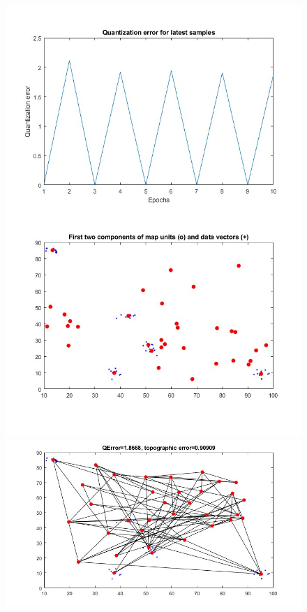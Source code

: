 \documentclass[11pt]{article}
\begin{document}
\begin{figure}[h]
  \includegraphics{screeny/WTA/WTA_5_object/WTA_learning_process.jpg}
  \includegraphics{screeny/WTA/WTA_5_object/WTA_Graph.jpg}

\end{figure}
\end{document}
